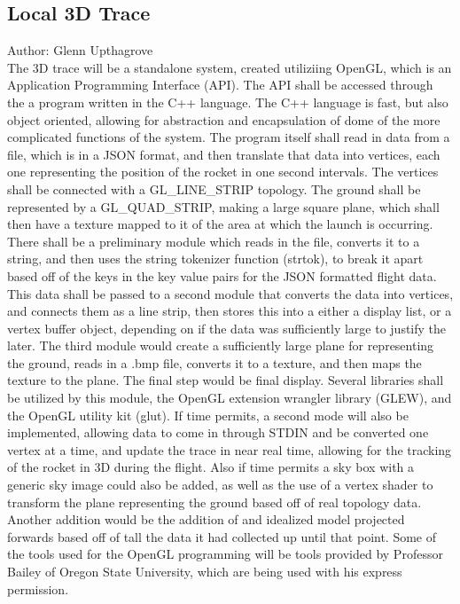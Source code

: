 \documentclass[onecolumn, draftclsnofoot,10pt, compsoc]{IEEEtran}
\begin{document}
\subsection {Local 3D Trace}
Author: Glenn Upthagrove \\
The 3D trace will be a standalone system, created utiliziing OpenGL, which is an Application Programming Interface (API). The API shall be accessed through the a program written in the C++ language. The C++ language is fast, but also object oriented, allowing for abstraction and encapsulation of dome of the more complicated functions of the system. The program itself shall read in data from a file, which is in a JSON format, and then translate that data into vertices, each one representing the position of the rocket in one second intervals. The vertices shall be connected with a GL\_LINE\_STRIP topology. The ground shall be represented by a GL\_QUAD\_STRIP, making a large square plane, which shall then have a texture mapped to it of the area at which the launch is occurring. There shall be a preliminary module which reads in the file, converts it to a string, and then uses the string tokenizer function (strtok), to break it apart based off of the keys in the key value pairs for the JSON formatted flight data. This data shall be passed to a second module that converts the data into vertices, and connects them as a line strip, then stores this into a either a display list, or a vertex buffer object, depending on if the data was sufficiently large to justify the later. The third module would create a sufficiently large plane for representing the ground, reads in a .bmp file, converts it to a texture, and then maps the texture to the plane. The final step would be final display. Several libraries shall be utilized by this module, the OpenGL extension wrangler library (GLEW), and the OpenGL utility kit (glut). \cite{refopengl} \cite{refjson} 
If time permits, a second mode will also be implemented, allowing data to come in through STDIN and be converted one vertex at a time, and update the trace in near real time, allowing for the tracking of the rocket in 3D during the flight. Also if time permits a sky box with a generic sky image could also be added, as well as the use of a vertex shader to transform the plane representing the ground based off of real topology data. Another addition would be the addition of and idealized model projected forwards based off of tall the data it had collected up until that point. Some of the tools used for the OpenGL programming will be tools provided by Professor Bailey of Oregon State University, which are being used with his express permission. 
\end{document}
